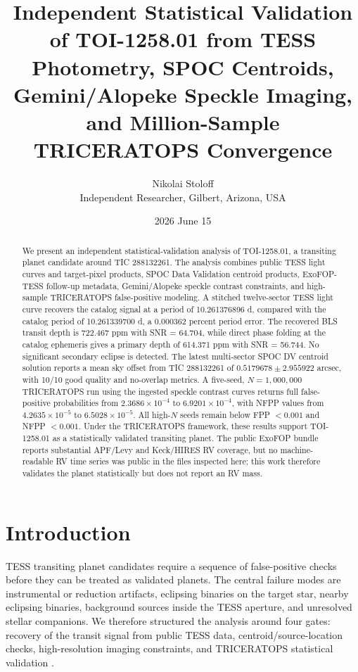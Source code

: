 \documentclass[11pt]{article}
\title{Independent Statistical Validation of TOI-1258.01 from TESS Photometry, SPOC Centroids, Gemini/Alopeke Speckle Imaging, and Million-Sample TRICERATOPS Convergence}
\author{Nikolai Stoloff\\Independent Researcher, Gilbert, Arizona, USA}
\date{2026 June 15}
\begin{document}
\linenumbers
\maketitle

\begin{abstract}
We present an independent statistical-validation analysis of TOI-1258.01, a transiting planet candidate around TIC 288132261. The analysis combines public TESS light curves and target-pixel products, SPOC Data Validation centroid products, ExoFOP-TESS follow-up metadata, Gemini/Alopeke speckle contrast constraints, and high-sample TRICERATOPS false-positive modeling. A stitched twelve-sector TESS light curve recovers the catalog signal at a period of 10.261376896 d, compared with the catalog period of 10.261339700 d, a 0.000362 percent period error. The recovered BLS transit depth is 722.467 ppm with SNR = 64.704, while direct phase folding at the catalog ephemeris gives a primary depth of 614.371 ppm with SNR = 56.744. No significant secondary eclipse is detected. The latest multi-sector SPOC DV centroid solution reports a mean sky offset from TIC 288132261 of $0.5179678 \pm 2.955922$ arcsec, with 10/10 good quality and no-overlap metrics. A five-seed, $N=1{,}000{,}000$ TRICERATOPS run using the ingested speckle contrast curves returns full false-positive probabilities from $2.3686\times10^{-4}$ to $6.9201\times10^{-4}$, with NFPP values from $4.2635\times10^{-5}$ to $6.5028\times10^{-5}$. All high-$N$ seeds remain below FPP $<0.001$ and NFPP $<0.001$. Under the TRICERATOPS framework, these results support TOI-1258.01 as a statistically validated transiting planet. The public ExoFOP bundle reports substantial APF/Levy and Keck/HIRES RV coverage, but no machine-readable RV time series was public in the files inspected here; this work therefore validates the planet statistically but does not report an RV mass.
\end{abstract}

\section{Introduction}
TESS transiting planet candidates require a sequence of false-positive checks before they can be treated as validated planets. The central failure modes are instrumental or reduction artifacts, eclipsing binaries on the target star, nearby eclipsing binaries, background sources inside the TESS aperture, and unresolved stellar companions. We therefore structured the analysis around four gates: recovery of the transit signal from public TESS data, centroid/source-location checks, high-resolution imaging constraints, and TRICERATOPS statistical validation \cite{Giacalone2021,GiacaloneDressing2020}.
\end{document}

